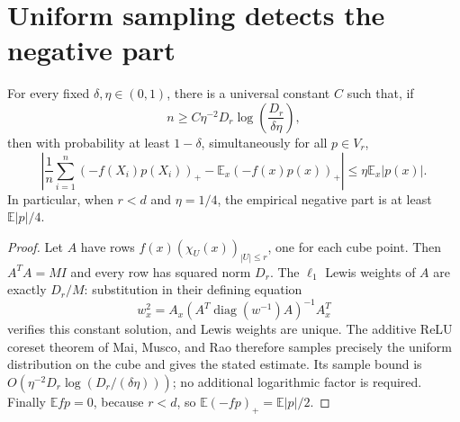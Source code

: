 \section{Uniform sampling detects the negative part}
\begin{lemma}\label{lem:schedule-relu}
For every fixed $\delta,\eta\in(0,1)$, there is a universal constant
$C$ such that, if
\[
 n\ge C\eta^{-2}D_r\log\!\left(\frac{D_r}{\delta\eta}\right),
\]
then with probability at least $1-\delta$, simultaneously for all
$p\in V_r$,
\[
 \left|\frac1n\sum_{i=1}^n(-f(X_i)p(X_i))_+
             -\mathbb E_x(-f(x)p(x))_+\right|
 \le\eta\mathbb E_x|p(x)|.
\]
In particular, when $r<d$ and $\eta=1/4$, the empirical negative
part is at least $\mathbb E|p|/4$.
\end{lemma}
\begin{proof}
Let $A$ have rows $f(x)(\chi_U(x))_{|U|\le r}$, one for each cube
point. Then $A^TA=MI$ and every row has squared norm $D_r$.
The $\ell_1$ Lewis weights of $A$ are exactly $D_r/M$: substitution
in their defining equation
\[
 w_x^2=A_x(A^T\operatorname{diag}(w^{-1})A)^{-1}A_x^T
\]
verifies this constant solution, and Lewis weights are unique.
The additive ReLU coreset theorem of Mai, Musco, and Rao
\cite[Theorem~5]{mai2021coresets} therefore samples precisely the uniform
distribution on the cube and gives the stated estimate. Its sample bound
is $O(\eta^{-2}D_r\log(D_r/(\delta\eta)))$; no additional logarithmic
factor is required. Finally $\mathbb E fp=0$, because $r<d$, so
$\mathbb E(-fp)_+=\mathbb E|p|/2$.
\end{proof}

